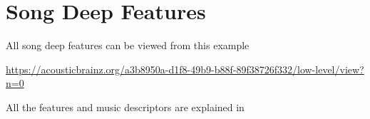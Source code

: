 
\chapter{Song Deep Features}

\label{AppendixB}

All song deep features can be viewed from this example

\url{https://acousticbrainz.org/a3b8950a-d1f8-49b9-b88f-89f38726f332/low-level/view?n=0}

All the features and music descriptors are explained in \cite{essentiafeatures}


